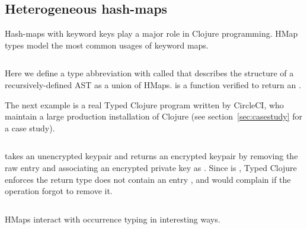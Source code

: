 \subsection{Heterogeneous hash-maps}

Hash-maps with keyword keys play a major role in Clojure programming.
HMap types model the most common usages of keyword maps.

\begin{Code}
\begin{exmp}
\inputminted[firstline=6,lastline=13]{clojure}{code/demo/src/demo/hmap.clj}
\end{exmp}
\end{Code}

Here we define a type abbreviation with  called 
that describes the structure of a recursively-defined AST as a union of HMaps.
 is a function verified to return an .

The next example is a real Typed Clojure program written by CircleCI, who maintain a large production
installation of Clojure (see section~\ref{sec:casestudy} for a case study).

\begin{Code}
\begin{exmp}
\inputminted[firstline=10,lastline=22]{clojure}{code/demo/src/demo/key.clj}
\end{exmp}
\end{Code}

 takes an unencrypted keypair and returns an encrypted keypair by
removing the raw  entry and associating an encrypted private key
as .
Since  is , Typed Clojure enforces the return type
does not contain an entry , and would complain if the 
operation forgot to remove it.

\begin{Code}
\begin{exmp}
\inputminted[firstline=10,lastline=23]{clojure}{code/demo/src/demo/key2.clj}
\end{exmp}
\end{Code}


HMaps interact with occurrence typing in interesting ways.

\begin{Code}
\begin{exmp}
\inputminted[firstline=15,lastline=27]{clojure}{code/demo/src/demo/hmap.clj}
\end{exmp}
\end{Code}

